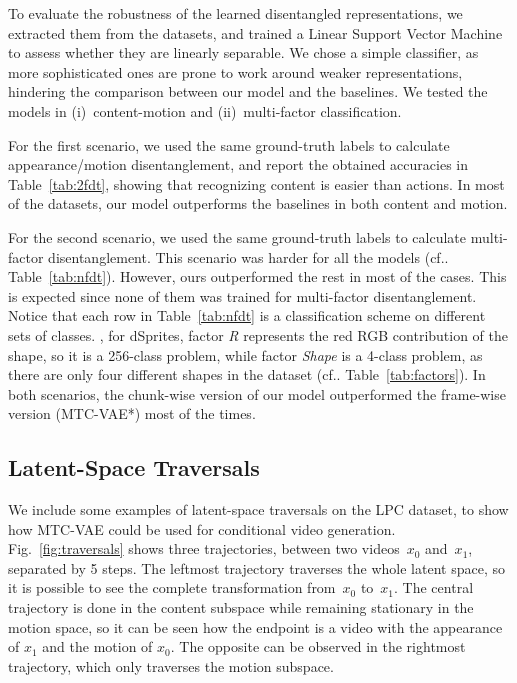 \documentclass[journal]{IEEEtran}
\makeatletter
\DeclareRobustCommand\onedot{\futurelet\@let@token\@onedot}
\def\@onedot{\ifx\@let@token.\else.\null\fi\xspace}
\def\cf{{cf}\onedot} \def\Cf{{Cf}\onedot}
\makeatother
\begin{document}
To evaluate the robustness of the learned disentangled representations, we extracted them from the datasets, and trained a Linear Support Vector Machine to assess whether they are linearly separable.
We chose a simple classifier, as more sophisticated ones are prone to work around weaker representations, hindering the comparison between our model and the baselines.
We tested the models in (i)~content-motion and (ii)~multi-factor classification.

For the first scenario, we used the same ground-truth labels to calculate appearance/motion disentanglement, and report the obtained accuracies in Table~\ref{tab:2fdt}, showing that recognizing content is easier than actions.
In most of the datasets, our model outperforms the baselines in both content and motion.

For the second scenario, we used the same ground-truth labels to calculate multi-factor disentanglement.
This scenario was harder for all the models (\cf Table~\ref{tab:nfdt}).
However, ours outperformed the rest in most of the cases.
This is expected since none of them was trained for multi-factor disentanglement.
Notice that each row in Table~\ref{tab:nfdt} is a classification scheme on different sets of classes.
\Eg, for dSprites, factor \textit{R} represents the red RGB contribution of the shape, so it is a 256-class problem, while factor \textit{Shape} is a 4-class problem, as there are only four different shapes in the dataset (\cf Table~\ref{tab:factors}).
In both scenarios, the chunk-wise version of our model outperformed the frame-wise version (MTC-VAE*) most of the times.

\subsection{Latent-Space Traversals}
\label{sec:traversals}

We include some examples of latent-space traversals on the LPC dataset, to show how MTC-VAE could be used for conditional video generation.
Fig.~\ref{fig:traversals} shows three trajectories, between two videos~$x_0$ and~$x_1$, separated by 5 steps.
The leftmost trajectory traverses the whole latent space, so it is possible to see the complete transformation from~$x_0$ to~$x_1$.
The central trajectory is done in the content subspace while remaining stationary in the motion space, so it can be seen how the endpoint is a video with the appearance of $x_1$ and the motion of $x_0$.
The opposite can be observed in the rightmost trajectory, which only traverses the motion subspace.
\end{document}

